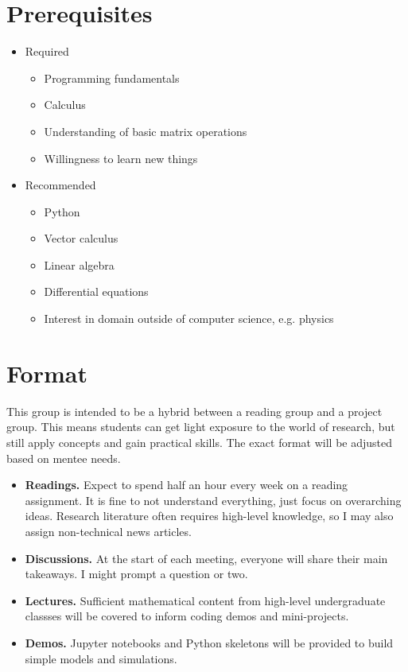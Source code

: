 \documentclass{article}
\begin{document}
	\section*{Prerequisites}
	\begin{itemize}
		\item Required
		\begin{itemize}
			\item Programming fundamentals
			\item Calculus
			\item Understanding of basic matrix operations
			\item Willingness to learn new things
		\end{itemize}
		\item Recommended
		\begin{itemize}
			\item Python
			\item Vector calculus
			\item Linear algebra
			\item Differential equations
			\item Interest in domain outside of computer science, e.g. physics
		\end{itemize}
	\end{itemize}
	
	\section*{Format}
	This group is intended to be a hybrid between a reading group and a project group. This means students can get light exposure to the world of research, but still apply concepts and gain practical skills. The exact format will be adjusted based on mentee needs.
	\begin{itemize}
	\item \textbf{Readings.} Expect to spend half an hour every week on a reading assignment. It is fine to not understand everything, just focus on overarching ideas. Research literature often requires high-level knowledge, so I may also assign non-technical news articles.
	\item \textbf{Discussions.} At the start of each meeting, everyone will share their main takeaways. I might prompt a question or two.
	\item \textbf{Lectures.} Sufficient mathematical content from high-level undergraduate classses will be covered to inform coding demos and mini-projects.
	\item \textbf{Demos.} Jupyter notebooks and Python skeletons will be provided to build simple models and simulations.
	\end{itemize}
\end{document}
